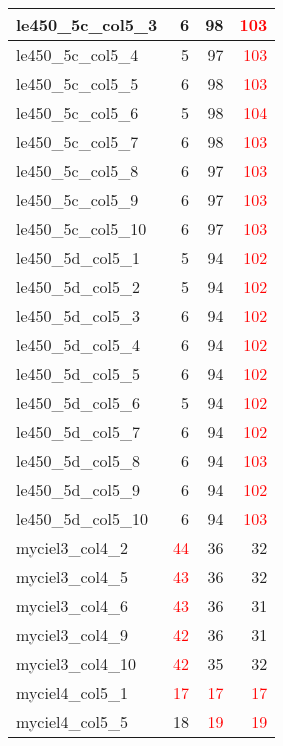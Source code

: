 \begin{longtable}{l|rrr}
  le450\_5c\_col5\_3 & 6 & 98 & \textcolor{red}{103} \\ \hline
  le450\_5c\_col5\_4 & 5 & 97 & \textcolor{red}{103} \\ \hline
  le450\_5c\_col5\_5 & 6 & 98 & \textcolor{red}{103} \\ \hline
  le450\_5c\_col5\_6 & 5 & 98 & \textcolor{red}{104} \\ \hline
  le450\_5c\_col5\_7 & 6 & 98 & \textcolor{red}{103} \\ \hline
  le450\_5c\_col5\_8 & 6 & 97 & \textcolor{red}{103} \\ \hline
  le450\_5c\_col5\_9 & 6 & 97 & \textcolor{red}{103} \\ \hline
  le450\_5c\_col5\_10 & 6 & 97 & \textcolor{red}{103} \\ \hline
  le450\_5d\_col5\_1 & 5 & 94 & \textcolor{red}{102} \\ \hline
  le450\_5d\_col5\_2 & 5 & 94 & \textcolor{red}{102} \\ \hline
  le450\_5d\_col5\_3 & 6 & 94 & \textcolor{red}{102} \\ \hline
  le450\_5d\_col5\_4 & 6 & 94 & \textcolor{red}{102} \\ \hline
  le450\_5d\_col5\_5 & 6 & 94 & \textcolor{red}{102} \\ \hline
  le450\_5d\_col5\_6 & 5 & 94 & \textcolor{red}{102} \\ \hline
  le450\_5d\_col5\_7 & 6 & 94 & \textcolor{red}{102} \\ \hline
  le450\_5d\_col5\_8 & 6 & 94 & \textcolor{red}{103} \\ \hline
  le450\_5d\_col5\_9 & 6 & 94 & \textcolor{red}{102} \\ \hline
  le450\_5d\_col5\_10 & 6 & 94 & \textcolor{red}{103} \\ \hline
  myciel3\_col4\_2 & \textcolor{red}{44} & 36 & 32 \\ \hline
  myciel3\_col4\_5 & \textcolor{red}{43} & 36 & 32 \\ \hline
  myciel3\_col4\_6 & \textcolor{red}{43} & 36 & 31 \\ \hline
  myciel3\_col4\_9 & \textcolor{red}{42} & 36 & 31 \\ \hline
  myciel3\_col4\_10 & \textcolor{red}{42} & 35 & 32 \\ \hline
  myciel4\_col5\_1 & \textcolor{red}{17} & \textcolor{red}{17} & \textcolor{red}{17} \\ \hline
  myciel4\_col5\_5 & 18 & \textcolor{red}{19} & \textcolor{red}{19} \\ \hline

\end{longtable}
